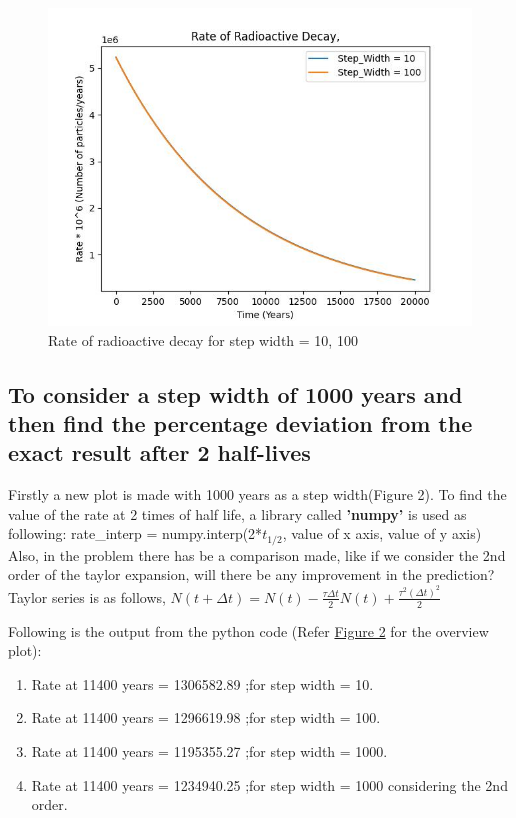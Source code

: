 \documentclass[11pt]{article}
\begin{document}
\begin{justify}
\begin{figure}[b]
    \centering
    \includegraphics[width=\textwidth, height=\textheight, keepaspectratio]{Carbon_plot_10_100.jpeg}
    \caption{Rate of radioactive decay for step width = 10, 100}
    \label{fig:Rate of radioactive decay for step width = 10, 100}
\end{figure}

\subsection{To consider a step width of 1000 years and then find the percentage deviation from the exact result after 2 half-lives}

Firstly a new plot is made with 1000 years as a step width(Figure 2).
To find the value of the rate at 2 times of half life, a library called \textbf{'numpy'} is used as following: rate\_interp = numpy.interp(2*$t_{1/2}$, value of x axis, value of y axis)
Also, in the problem there has be a comparison made, like if we consider the 2nd order of the taylor expansion, will there be any improvement in the prediction?
Taylor series is as follows,
$N(t+\Delta t) = N(t) - \frac{\tau \Delta t}{2} N(t) + \frac{\tau^2 (\Delta t)^2}{2}$

Following is the output from the python code (Refer \hyperref[fig:Rate of radioactive decay for step width = 10, 100, 1000]{Figure 2} for the overview plot):
\begin{enumerate}
    \item Rate at 11400 years = 1306582.89 ;for step width = 10.
    \item Rate at 11400 years = 1296619.98 ;for step width = 100.
    \item Rate at 11400 years = 1195355.27 ;for step width = 1000.
    \item Rate at 11400 years = 1234940.25 ;for step width = 1000 considering the 2nd order.
\end{enumerate}


\end{justify}
\end{document}
